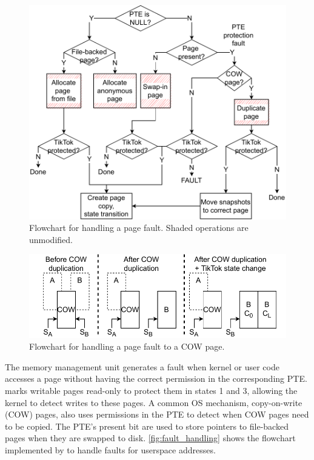 \documentclass[letterpaper,twocolumn,10pt]{article}
\begin{document}
\begin{figure}[h]
  \includegraphics[width=\linewidth]{img/pagefault.pdf}
  \caption{Flowchart for handling a page fault. Shaded 
          operations are unmodified.}
  \label{fig:fault_handling}
\end{figure}

\begin{figure}[h]
  \includegraphics[width=\linewidth]{img/pagefault_cow.pdf}
  \caption{Flowchart for handling a page fault to a COW page.}
  \label{fig:fault_handling_cow}
\end{figure}

The memory management unit generates a fault when kernel or user code accesses
a page without having the correct permission in the corresponding PTE.
\tiktok marks writable pages read-only to protect them in 
states 1 and 3, allowing the kernel to detect writes to these pages.
A common OS mechanism, copy-on-write (COW) pages, also uses 
permissions in the PTE to detect when COW pages need to be copied.
The PTE's present bit are used to store pointers to file-backed pages
when they are swapped to disk.
\autoref{fig:fault_handling} shows the flowchart implemented by
 to handle faults for userspace addresses.
\end{document}
